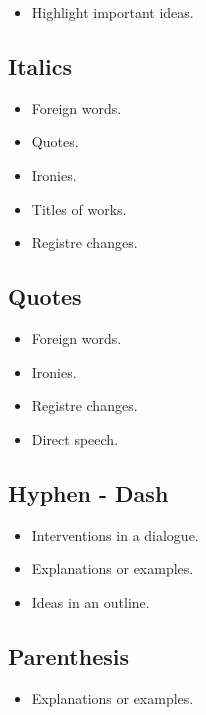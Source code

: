 \documentclass{article}
\begin{document}
\begin{itemize}
    \item Highlight important ideas.
\end{itemize}

\subsection*{Italics}

\begin{itemize}
    \item Foreign words.
    \item Quotes.
    \item Ironies.
    \item Titles of works.
    \item Registre changes.
\end{itemize}

\subsection*{Quotes}

\begin{itemize}
    \item Foreign words.
    \item Ironies.
    \item Registre changes.
    \item Direct speech.
\end{itemize}

\subsection*{Hyphen - Dash}

\begin{itemize}
    \item Interventions in a dialogue.
    \item Explanations or examples.
    \item Ideas in an outline.
\end{itemize}

\subsection*{Parenthesis}

\begin{itemize}
    \item Explanations or examples.
\end{itemize}
\end{document}
